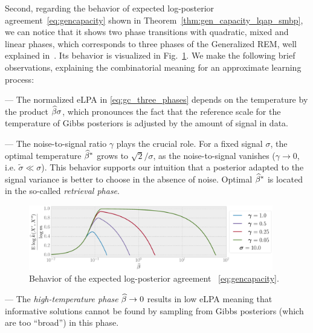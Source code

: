 Second, regarding the behavior of expected log-posterior
agreement~\eqref{eq:gencapacity} shown in
Theorem~\ref{thm:gen_capacity_lqap_smbp}, we can notice that it shows two phase
transitions with quadratic, mixed and linear phases, which corresponds to three
phases of the Generalized REM, well explained in~\citep[][Section 3]{derrida86}.
Its behavior is visualized in Fig.~\ref{fig:theor_gen_capacity}. We make the
following brief observations, explaining the combinatorial meaning for an
approximate learning process:

--- The normalized eLPA in \eqref{eq:gc_three_phases} depends on the temperature
    by the product $\widehat{\beta} \sigma$, which pronounces the fact that the
    reference scale for the temperature of Gibbs posteriors is adjusted by the
    amount of signal in data.

--- The noise-to-signal ratio $\gamma$ plays the crucial role.  
    For a fixed signal $\sigma$, the optimal
    temperature $\widehat{\beta}^*$ grows to $\sqrt{2}/\sigma$, as the
    noise-to-signal vanishes ($\gamma \to 0$, i.e. $\tilde\sigma \ll \sigma$).
    This behavior supports our intuition that a posterior adapted to the signal
    variance is better to choose in the absence of noise. Optimal $\widehat{\beta}^*$ is
    located in the so-called \textit{retrieval phase}.

\begin{figure}[htbp]
  \centering
  \includegraphics[width=0.95\textwidth]{figures/ch_free_energy/gc_theor_beta_up-to-100_v1}
  \caption{Behavior of the expected log-posterior agreement%
    ~\eqref{eq:gencapacity}.}
  \label{fig:theor_gen_capacity}
\end{figure}

--- The \textit{high-temperature phase} $\widehat{\beta} \to 0$ results in low eLPA 
    meaning that informative solutions cannot be found by sampling from Gibbs
    posteriors (which are too ``broad'') in this phase.


